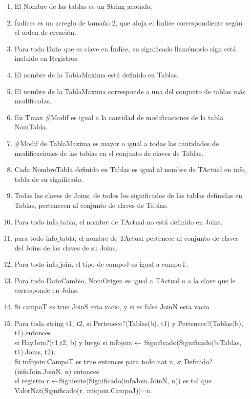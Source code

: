 \begin{enumerate}
  \item El Nombre de las tablas es un String acotado.
  \item Índices es un arreglo de tamaño 2, que aloja el Índice correspondiente según el orden de creación.
  \item Para toda Dato que es clave en Índice, su significado llamémoslo sign está incluido en Registros.
  \item El nombre de la TablaMaxima está definido en Tablas.
  \item El nombre de la TablaMaxima corresponde a una del conjunto de tablas más modificadas.
  \item En Tmax $\#$Modif es igual a la cantidad de modificaciones de la tabla NomTabla.
  \item $\#$Modif de TablaMaxima es mayor o igual a todas las cantidades de modificaciones de las tablas en el conjunto de claves de Tablas.
  \item Cada NombreTabla definido en Tablas es igual al nombre de TActual en info$\_$tabla de su significado.
  \item Todas las claves de Joins, de todos los significados de las tablas definidas en Tablas, pertenecen al conjunto de claves de Tablas.
  \item Para todo info$\_$tabla, el nombre de TActual no está definido en Joins.
  \item para todo info$\_$tabla, el nombre de TActual pertenece al conjunto de claves del Joins de las claves de su Joins.
  \item Para todo info$\_$join, el tipo de campoJ es igual a campoT.
  \item Para todo DatoCambio, NomOrigen es igual a TActual o a la clave que le corresponde en Joins.
  \item Si campoT es true JoinS esta vacio, y si es false JoinN esta vacio.	
  
  
  \item Para toda string t1, t2, si Pertenece?(Tablas(b), t1) y Pertenece?(Tablas(b), t1) entonces\\
  si HayJoin?(t1,t2, b) y luego si infojoin $\leftarrow$ Significado(Significado(b.Tablas, t1).Joins, t2).\\
  Si infojoin.CampoT es true entonces para todo nat n, si Definido?(infoJoin.JoinN, n) entonces\\
  el registro r $\leftarrow$Siguiente(Significado(infoJoin.JoinN, n)) es tal que \\
  ValorNat(Significado(r, infojoin.CampoJ))=n.


\end{enumerate}
